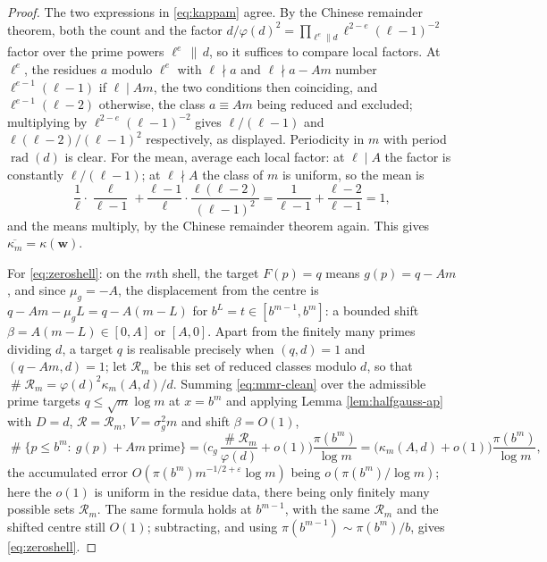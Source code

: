 \documentclass[11pt,reqno]{amsart}
\theoremstyle{plain}
\theoremstyle{definition}
\DeclareMathOperator{\Card}{\#}
\DeclareMathOperator{\rad}{rad}
\begin{document}
\begin{proof}
The two expressions in \eqref{eq:kappam} agree. By the Chinese remainder theorem, both the count and the factor $d/\varphi(d)^{2}=\prod_{\ell^{e}\|d}\ell^{2-e}(\ell-1)^{-2}$ factor over the prime powers $\ell^{e}\,\|\,d$, so it suffices to compare local factors. At $\ell^{e}$, the residues $a$ modulo $\ell^{e}$ with $\ell\nmid a$ and $\ell\nmid a-Am$ number $\ell^{e-1}(\ell-1)$ if $\ell\mid Am$, the two conditions then coinciding, and $\ell^{e-1}(\ell-2)$ otherwise, the class $a\equiv Am$ being reduced and excluded; multiplying by $\ell^{2-e}(\ell-1)^{-2}$ gives $\ell/(\ell-1)$ and $\ell(\ell-2)/(\ell-1)^{2}$ respectively, as displayed. Periodicity in $m$ with period $\rad(d)$ is clear. For the mean, average each local factor: at $\ell\mid A$ the factor is constantly $\ell/(\ell-1)$; at $\ell\nmid A$ the class of $m$ is uniform, so the mean is
\[
\frac1\ell\cdot\frac{\ell}{\ell-1}+\frac{\ell-1}{\ell}\cdot\frac{\ell(\ell-2)}{(\ell-1)^{2}}=\frac{1}{\ell-1}+\frac{\ell-2}{\ell-1}=1 ,
\]
and the means multiply, by the Chinese remainder theorem again. This gives $\overline{\kappa_m}=\kappa(\mathbf w)$.

For \eqref{eq:zeroshell}: on the $m$th shell, the target $F(p)=q$ means $g(p)=q-Am$, and since $\mu_g=-A$, the displacement from the centre is $q-Am-\mu_g L=q-A(m-L)$ for $b^{L}=t\in[b^{m-1},b^m]$: a bounded shift $\beta=A(m-L)\in[0,A]$ or $[A,0]$. Apart from the finitely many primes dividing $d$, a target $q$ is realisable precisely when $(q,d)=1$ and $(q-Am,d)=1$; let $\mathcal R_m$ be this set of reduced classes modulo $d$, so that $\Card\mathcal R_m=\varphi(d)^{2}\kappa_m(A,d)/d$. Summing \eqref{eq:mmr-clean} over the admissible prime targets $q\le\sqrt m\log m$ at $x=b^{m}$ and applying Lemma \ref{lem:halfgauss-ap} with $D=d$, $\mathcal R=\mathcal R_m$, $V=\sigma_g^{2}m$ and shift $\beta=O(1)$,
\[
\Card\{p\le b^{m}:\ g(p)+Am\ \text{prime}\}
=\Big(c_g\,\frac{\Card\mathcal R_m}{\varphi(d)}+o(1)\Big)\frac{\pi(b^{m})}{\log m}
=\big(\kappa_m(A,d)+o(1)\big)\frac{\pi(b^{m})}{\log m},
\]
the accumulated error $O(\pi(b^m)m^{-1/2+\varepsilon}\log m)$ being $o(\pi(b^m)/\log m)$; here the $o(1)$ is uniform in the residue data, there being only finitely many possible sets $\mathcal R_m$. The same formula holds at $b^{m-1}$, with the same $\mathcal R_m$ and the shifted centre still $O(1)$; subtracting, and using $\pi(b^{m-1})\sim\pi(b^m)/b$, gives \eqref{eq:zeroshell}.


\end{proof}
\end{document}
